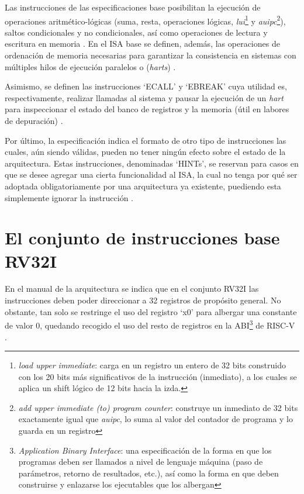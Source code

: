 Las instrucciones de las especificaciones base posibilitan la ejecución de operaciones aritmético-lógicas (suma, resta, operaciones lógicas, \textit{lui}\footnote{\textit{load upper immediate}: carga en un registro un entero de 32 bits construido con los 20 bits más significativos de la instrucción (inmediato), a los cuales se aplica un shift lógico de 12 bits hacia la izda.} y \textit{auipc}\footnote{\textit{add upper immediate (to) program counter}: construye un inmediato de 32 bits exactamente igual que \textit{auipc}, lo suma al valor del contador de programa y lo guarda en un registro}), saltos condicionales y no condicionales, así como operaciones de lectura y escritura en memoria \cite{riscv-unpriv-isa-20250508-unpriv-isa-arit-instr}. En el ISA base se definen, además, las operaciones de ordenación de memoria necesarias para garantizar la consistencia en sistemas con múltiples hilos de ejecución paralelos o (\textit{harts}) \cite{riscv-unpriv-isa-20250508-unpriv-isa-mem-order}.

Asimismo, se definen las instrucciones `ECALL'  y `EBREAK' cuya utilidad es, respectivamente, realizar llamadas al sistema y pausar la ejecución de un \textit{hart} para inspeccionar el estado del banco de registros y la memoria (útil en labores de depuración) \cite{riscv-unpriv-isa-20250508-unpriv-isa-ecall-ebreak}.

Por último, la especificación indica el formato de otro tipo de instrucciones las cuales, aún siendo válidas, pueden no tener ningún efecto sobre el estado de la arquitectura. Estas instrucciones, denominadas `HINTs', se reservan para casos en que se desee agregar una cierta funcionalidad al ISA, la cual no tenga por qué ser adoptada obligatoriamente por una arquitectura ya existente, puediendo esta simplemente ignorar la instrucción \cite{riscv-unpriv-isa-20250508-unpriv-isa-hint}.

\section{El conjunto de instrucciones base RV32I}

En el manual de la arquitectura se indica que en el conjunto RV32I las instrucciones deben poder direccionar a 32 registros de propósito general. No obstante, tan solo se restringe el uso del registro `x0' para albergar una constante de valor 0, quedando recogido el uso del resto de registros en la ABI\footnote{\textit{Application Binary Interface}: una especificación de la forma en que los programas deben ser llamados a nivel de lenguaje máquina (paso de parámetros, retorno de resultados, etc.), así como la forma en que deben construirse y enlazarse los ejecutables que los albergan} de RISC-V \cite{riscv-abi}.

